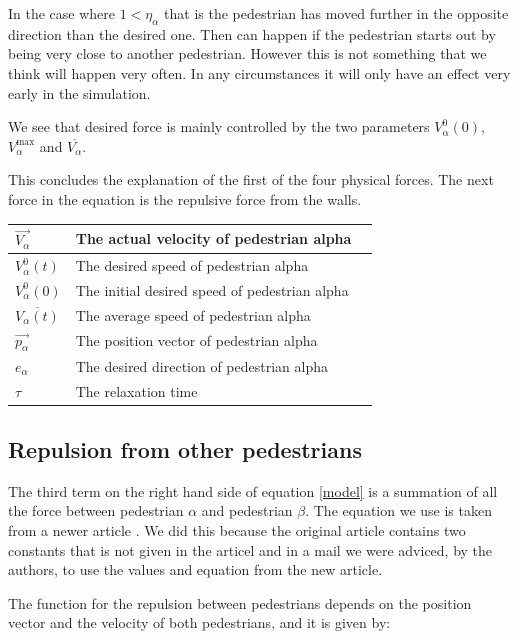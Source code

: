 In the case where $1 < \eta_{\alpha}$ that is the pedestrian has moved further 
in the opposite direction than the desired one. Then can happen if the pedestrian 
starts out by being very close to another pedestrian. However this is not something 
that we think will happen very often. In any circumstances it will only have an 
effect very early in the simulation. 

We see that desired force is mainly controlled by the two parameters $V_{\alpha}^{0} (0)$, 
$V_{\alpha}^{\text{max}}$ and $\overline{V_{\alpha}}$.

This concludes the explanation of the first of the four physical forces. The next 
force in the equation is the repulsive force from the walls.

\begin{center}
\begin{tabular}{lll}
\hline
$\overrightarrow{V_{\alpha}}$ & The actual velocity of pedestrian alpha &\\
\hline
$V_{\alpha}^{0}(t)$ & The desired speed of pedestrian alpha &\\
\hline
$V_{\alpha}^{0}(0)$ & The initial desired speed of pedestrian alpha &\\
\hline
$\overline{V_{\alpha}(t)}$ & The average speed of pedestrian alpha &\\
\hline
$\overrightarrow{p_{\alpha}}$ & The position vector of pedestrian alpha\\
\hline
$e_{\alpha}$& The desired direction of pedestrian alpha\\
\hline
$\tau$& The relaxation time &\\
\hline
\end{tabular}
\end{center}

\subsection{Repulsion from other pedestrians}
The third term on the right hand side of equation \eqref{model} is a summation of all the 
force between pedestrian $\alpha$ and pedestrian $\beta$. The equation we use is taken from a newer article \cite{ABconstant}. We did this because the original article contains two constants that is not given in the articel and in a mail we were adviced, by the authors, to use the values and equation from the new article. 

The function for the repulsion between pedestrians depends on the position vector and the velocity of 
both pedestrians, and it is given by:

